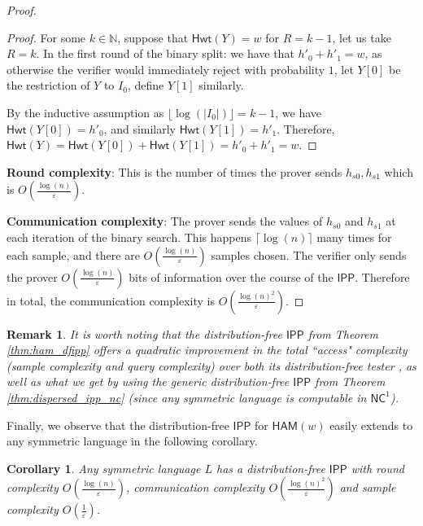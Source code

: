 \documentclass[11pt]{article}
\newtheorem{remark}{Remark}
\newtheorem{corollary}[theorem]{Corollary}
\newcommand{\NC}{\mathsf{NC}}
\newcommand{\Hamming}{\mathsf{Hwt}}
\newcommand{\HAM}{\mathsf{HAM}}
\newcommand{\IPP}{\mathsf{IPP}}
\newcommand{\N}{\mathbb{N}}
\begin{document}
\begin{proof}
\begin{proof}
For some $k \in \N$, suppose that $\Hamming(Y)=w$ for $R=k-1$, let us take $R=k$. In the first round of the binary split: we have that $h'_{0}+h'_{1}=w$, as otherwise the verifier would immediately reject with probability $1$, let $Y[0]$ be the restriction of $Y$ to $I_{0}$, define $Y[1]$ similarly. 

By the inductive assumption as $\lfloor \log(\vert I_{0}\vert )\rfloor=k-1$, we have $\Hamming(Y[0]) =h'_{0}$, and similarly $\Hamming(Y[1]) =h'_{1}$. 
Therefore, $\Hamming(Y)=\Hamming(Y[0])+\Hamming(Y[1])=h'_{0}+h'_{1}=w$.
\end{proof}

\textbf{Round complexity}: This is the number of times the prover sends $h_{s0}, h_{s1}$ which is $O\left(\frac{\log (n)}{\varepsilon}\right)$. 

\vspace{0.1in}
\textbf{Communication complexity}: The prover sends the values of $h_{s0}$ and $h_{s1}$ at each iteration of the binary search. This happens $\lceil \log (n) \rceil$ many times for each sample, and there are $O\left(\frac{\log (n)}{\varepsilon}\right)$ samples chosen. The verifier only sends the prover $O\left(\frac{\log (n)}{\varepsilon}\right)$ bits of information over the course of the $\IPP$. Therefore in total, the communication complexity is $O \left( \frac{\log(n)^{2}}{\varepsilon} \right)$.
\end{proof}

\begin{remark}
     It is worth noting that the distribution-free $\IPP$ from Theorem \ref{thm:ham_dfipp} offers a quadratic improvement in the total ``access" complexity (sample complexity and query complexity) over both its distribution-free tester \cite{CANETTI199517}, as well as what we get by using the generic distribution-free $\IPP$ from Theorem \ref{thm:dispersed_ipp_nc} (since any symmetric language is computable in $\NC^1$). 
\end{remark}

Finally, we observe that the distribution-free $\IPP$ for $\HAM(w)$ easily extends to any symmetric language in the following corollary.
\begin{corollary}
\label{cor:sym_dfipp}
Any symmetric language $L$ has a distribution-free $\IPP$ with round complexity $O\left(\frac{\log (n)}{\varepsilon}\right)$, communication complexity $O \left( \frac{\log(n)^{2}}{\varepsilon} \right)$ and sample complexity $O\left(\frac{1}{\varepsilon}\right)$.
\end{corollary}
\end{document}
